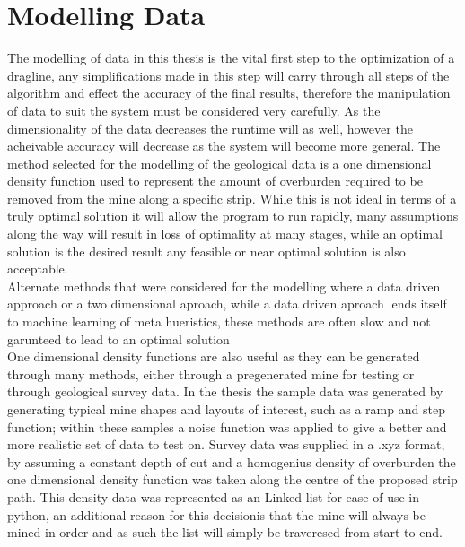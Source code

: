 
\section{Modelling Data}
The modelling of data in this thesis is the vital first step to the optimization of a dragline, any simplifications made in this step will carry through all steps of the algorithm and effect the accuracy of the final results, therefore the manipulation of data to suit the system must be considered very carefully. As the dimensionality of the data decreases the runtime will as well, however the acheivable accuracy will decrease as the system will become more general. The method selected for the modelling of the geological data is a one dimensional density function used to represent the amount of overburden required to be removed from the mine along a specific strip. While this is not ideal in terms of a truly optimal solution it will allow the program to run rapidly, many assumptions along the way will result in loss of optimality at many stages, while an optimal solution is the desired result any feasible or near optimal solution is also acceptable. 
\\
Alternate methods that were considered for the modelling where a data driven approach or a two dimensional aproach, while a data driven aproach lends itself to machine learning of meta hueristics, these methods are often slow and not garunteed to lead to an optimal solution 
\\

One dimensional density functions are also useful as they can be generated through many methods, either through a pregenerated mine for testing or through geological survey data. In the thesis the sample data was generated by generating typical mine shapes and layouts of interest, such as a ramp and step function; within these samples a noise function was applied to give a better and more realistic set of data to test on. Survey data was supplied in a .xyz format, by assuming a constant depth of cut and a homogenius density of overburden the one dimensional density function was taken along the centre of the proposed strip path. This density data was represented as an Linked list for ease of use in python, an additional reason for this decisionis that the mine will always be mined in order and as such the list will simply be traveresed from start to end.  


